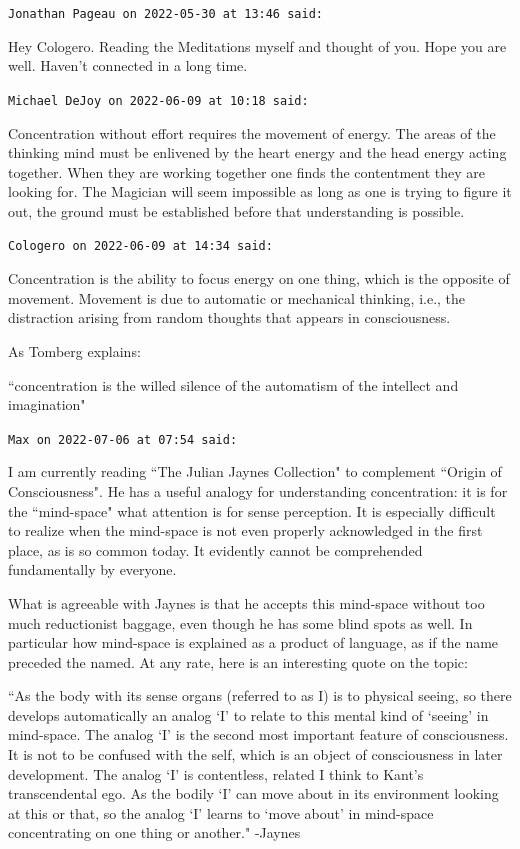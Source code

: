 \begin{footnotesize}\begin{sffamily}



\texttt{Jonathan Pageau on 2022-05-30 at 13:46 said: }

Hey Cologero. Reading the Meditations myself and thought of you. Hope you are well. Haven't connected in a long time.


\hfill

\texttt{Michael DeJoy on 2022-06-09 at 10:18 said: }

Concentration without effort requires the movement of energy. The areas of the thinking mind must be enlivened by the heart energy and the head energy acting together. When they are working together one finds the contentment they are looking for. The Magician will seem impossible as long as one is trying to figure it out, the ground must be established before that understanding is possible.


\hfill

\texttt{Cologero on 2022-06-09 at 14:34 said: }

Concentration is the ability to focus energy on one thing, which is the opposite of movement. Movement is due to automatic or mechanical thinking, i.e., the distraction arising from random thoughts that appears in consciousness.

As Tomberg explains:

``concentration is the willed silence of the automatism of the intellect and imagination"


\hfill

\texttt{Max on 2022-07-06 at 07:54 said: }

I am currently reading ``The Julian Jaynes Collection" to complement ``Origin of Consciousness". He has a useful analogy for understanding concentration: it is for the ``mind-space" what attention is for sense perception. It is especially difficult to realize when the mind-space is not even properly acknowledged in the first place, as is so common today. It evidently cannot be comprehended fundamentally by everyone.

What is agreeable with Jaynes is that he accepts this mind-space without too much reductionist baggage, even though he has some blind spots as well. In particular how mind-space is explained as a product of language, as if the name preceded the named. At any rate, here is an interesting quote on the topic:

``As the body with its sense organs (referred to as I) is to physical seeing, so there develops automatically an analog `I' to relate to this mental kind of `seeing' in mind-space. The analog `I' is the second most important feature of consciousness. It is not to be confused with the self, which is an object of consciousness in later development. The analog `I' is contentless, related I think to Kant's transcendental ego. As the bodily `I' can move about in its environment looking at this or that, so the analog `I' learns to `move about' in mind-space concentrating on one thing or another." -Jaynes


\end{sffamily}
\end{footnotesize}
